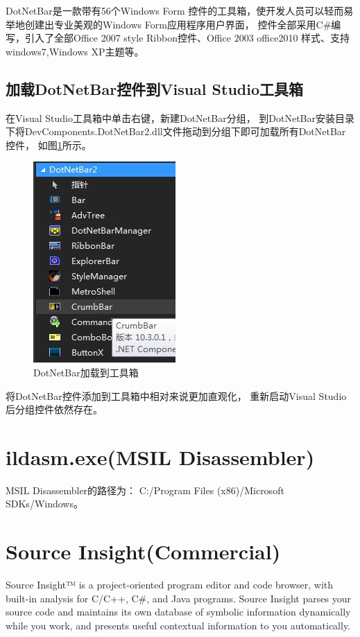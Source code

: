 \documentclass{book}
\begin{document}
DotNetBar是一款带有56个Windows Form 控件的工具箱，使开发人员可以轻而易举地创建出专业美观的Windows Form应用程序用户界面，
控件全部采用C\#编写，引入了全部Office 2007 style Ribbon控件、Office 2003 office2010 样式、支持windows7,Windows XP主题等。

\subsection{加载DotNetBar控件到Visual Studio工具箱}

在Visual Studio工具箱中单击右键，新建DotNetBar分组，
到DotNetBar安装目录下将DevComponents.DotNetBar2.dll文件拖动到分组下即可加载所有DotNetBar控件，
如图\ref{fig:DotNetBarControlLoadIntoToolBox}所示。

\begin{figure}[htbp]
	\centering
	\includegraphics[scale=0.8]{DotNetBarControlLoadIntoToolBox.jpg}
	\caption{DotNetBar加载到工具箱}
	\label{fig:DotNetBarControlLoadIntoToolBox}
\end{figure}

将DotNetBar控件添加到工具箱中相对来说更加直观化，
重新启动Visual Studio后分组控件依然存在。

\section{ildasm.exe(MSIL Disassembler)}

MSIL Disassembler的路径为：
C:/Program Files (x86)/Microsoft SDKs/Windows。

\section{Source Insight(Commercial)}

Source Insight™ is a project-oriented program editor and code browser, 
with built-in analysis for C/C++, C\#, and Java programs. 
Source Insight parses your source code and maintains its 
own database of symbolic information dynamically while you work, 
and presents useful contextual information to you automatically.
\end{document}
